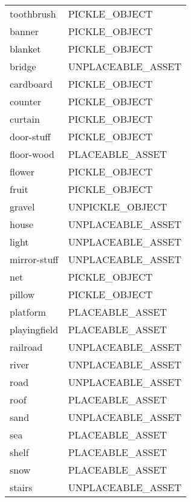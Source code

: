 \begin{supertabular}{|l|l|}
  toothbrush            & \tiny{PICKLE\_OBJECT    } \\
  banner                & \tiny{PICKLE\_OBJECT    } \\
  blanket               & \tiny{PICKLE\_OBJECT    } \\
  bridge                & \tiny{UNPLACEABLE\_ASSET} \\
  cardboard             & \tiny{PICKLE\_OBJECT    } \\
  counter               & \tiny{PICKLE\_OBJECT    } \\
  curtain               & \tiny{PICKLE\_OBJECT    } \\
  door-stuff            & \tiny{PICKLE\_OBJECT    } \\
  floor-wood            & \tiny{PLACEABLE\_ASSET  } \\
  flower                & \tiny{PICKLE\_OBJECT    } \\
  fruit                 & \tiny{PICKLE\_OBJECT    } \\
  gravel                & \tiny{UNPICKLE\_OBJECT  } \\
  house                 & \tiny{UNPLACEABLE\_ASSET} \\
  light                 & \tiny{UNPLACEABLE\_ASSET} \\
  mirror-stuff          & \tiny{UNPLACEABLE\_ASSET} \\
  net                   & \tiny{PICKLE\_OBJECT    } \\
  pillow                & \tiny{PICKLE\_OBJECT    } \\
  platform              & \tiny{PLACEABLE\_ASSET  } \\
  playingfield          & \tiny{PLACEABLE\_ASSET  } \\
  railroad              & \tiny{UNPLACEABLE\_ASSET} \\
  river                 & \tiny{UNPLACEABLE\_ASSET} \\
  road                  & \tiny{UNPLACEABLE\_ASSET} \\
  roof                  & \tiny{PLACEABLE\_ASSET  } \\
  sand                  & \tiny{UNPLACEABLE\_ASSET} \\
  sea                   & \tiny{PLACEABLE\_ASSET  } \\
  shelf                 & \tiny{PLACEABLE\_ASSET  } \\
  snow                  & \tiny{PLACEABLE\_ASSET  } \\
  stairs                & \tiny{UNPLACEABLE\_ASSET} \\

\end{supertabular}
